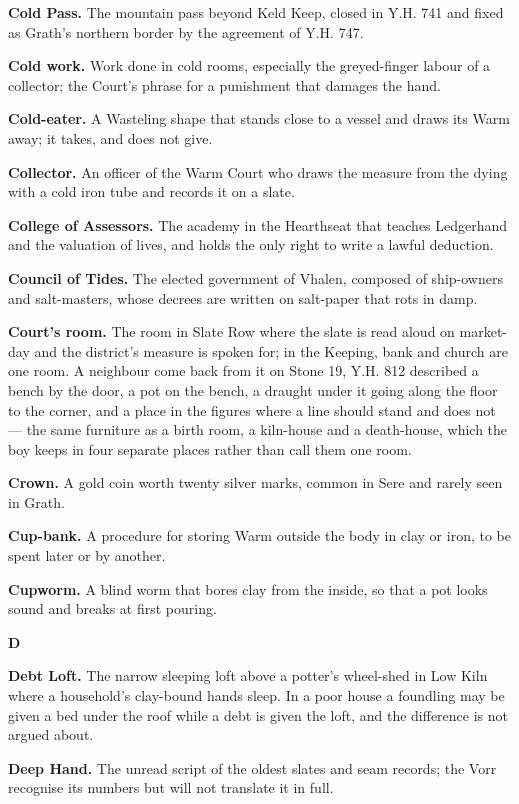 \documentclass{design/chronicle}
\begin{document}
\textbf{Cold Pass.} The mountain pass beyond Keld Keep, closed in Y.H. 741 and fixed as Grath’s northern border by the agreement of Y.H. 747.

\textbf{Cold work.} Work done in cold rooms, especially the greyed-finger labour of a collector; the Court’s phrase for a punishment that damages the hand.

\textbf{Cold-eater.} A Wasteling shape that stands close to a vessel and draws its Warm away; it takes, and does not give.

\textbf{Collector.} An officer of the Warm Court who draws the measure from the dying with a cold iron tube and records it on a slate.

\textbf{College of Assessors.} The academy in the Hearthseat that teaches Ledgerhand and the valuation of lives, and holds the only right to write a lawful deduction.

\textbf{Council of Tides.} The elected government of Vhalen, composed of ship-owners and salt-masters, whose decrees are written on salt-paper that rots in damp.

\textbf{Court’s room.} The room in Slate Row where the slate is read aloud on market-day and the district’s measure is spoken for; in the Keeping, bank and church are one room. A neighbour come back from it on Stone 19, Y.H. 812 described a bench by the door, a pot on the bench, a draught under it going along the floor to the corner, and a place in the figures where a line should stand and does not --- the same furniture as a birth room, a kiln-house and a death-house, which the boy keeps in four separate places rather than call them one room.

\textbf{Crown.} A gold coin worth twenty silver marks, common in Sere and rarely seen in Grath.

\textbf{Cup-bank.} A procedure for storing Warm outside the body in clay or iron, to be spent later or by another.

\textbf{Cupworm.} A blind worm that bores clay from the inside, so that a pot looks sound and breaks at first pouring.

\textbf{D}

\textbf{Debt Loft.} The narrow sleeping loft above a potter’s wheel-shed in Low Kiln where a household’s clay-bound hands sleep. In a poor house a foundling may be given a bed under the roof while a debt is given the loft, and the difference is not argued about.

\textbf{Deep Hand.} The unread script of the oldest slates and seam records; the Vorr recognise its numbers but will not translate it in full.
\end{document}
